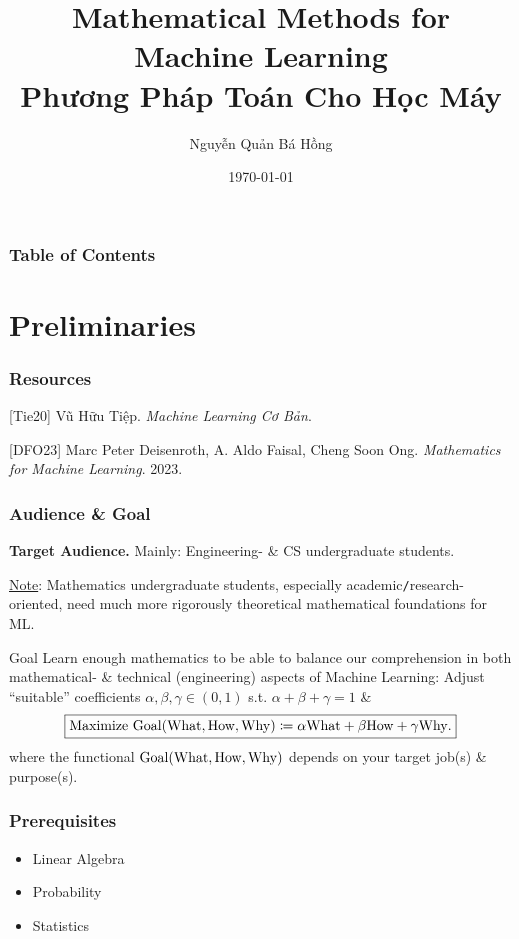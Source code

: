 \documentclass{beamer}
\title{Mathematical Methods for Machine Learning\\Phương Pháp Toán Cho Học Máy}
\author{\sc Nguyễn Quản Bá Hồng}
\institute{UMT -- University of Management \& Technology of HCMC}
\date{\today}
\begin{document}
\frame{\titlepage}
\begin{frame}
	\frametitle{Table of Contents}
	\tableofcontents
\end{frame}

\section{Preliminaries}

\begin{frame}
	\frametitle{Resources}
	[Tie20] {\sc Vũ Hữu Tiệp}. {\it Machine Learning Cơ Bản}.
	\vspace{2mm}
	
	[DFO23] {\sc Marc Peter Deisenroth, A. Aldo Faisal, Cheng Soon Ong}. {\it Mathematics for Machine Learning}. 2023.
\end{frame}

\begin{frame}
	\frametitle{Audience \& Goal}
	{\bf Target Audience.} Mainly: Engineering- \& CS undergraduate students.
	
	\underline{Note}: Mathematics undergraduate students, especially academic{\tt/}research-oriented, need much more rigorously theoretical mathematical foundations for ML.	
	\begin{block}{Goal}
		Learn enough mathematics to be able to balance our comprehension in both mathematical- \& technical (engineering) aspects of Machine Learning: Adjust ``suitable'' coefficients $\alpha,\beta,\gamma\in(0,1)$ s.t. $\alpha + \beta + \gamma = 1$ \&
		\begin{equation}
			 \boxed{\mbox{Maximize } {\rm Goal}({\rm What,How,Why})\coloneqq\alpha{\rm What} + \beta{\rm How} + \gamma{\rm Why}.}
		\end{equation}
		where the functional ${\rm Goal}({\rm What,How,Why})$ depends on your target job(s) \& purpose(s).
	\end{block}
\end{frame}

\begin{frame}
	\frametitle{Prerequisites}
	\begin{itemize}
		\item Linear Algebra
		\item Probability
		\item Statistics
	\end{itemize}
\end{frame}
	
\end{document}
